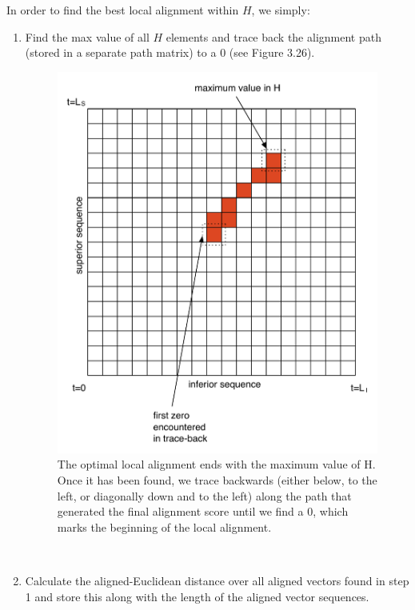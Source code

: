 \documentclass[a4paper,12pt]{report} 	%
\numberwithin{figure}{chapter}
\numberwithin{table}{chapter}
\numberwithin{equation}{chapter}
\begin{document}
\begin{flushleft}
In order to find the best local alignment within $H$, we simply:
\begin{enumerate}
\item Find the max value of all $H$ elements and trace back the alignment path (stored in a separate path matrix) to a $0$ (see Figure 3.26).
\begin{figure}[h!]
\begin{center}
\includegraphics[scale=0.75]{SIC-DPLA_1}
\caption[Finding Optimal Subsequence]{The optimal local alignment ends with the maximum value of H. Once it has been found, we trace backwards (either below, to the left, or diagonally down and to the left) along the path that generated the final alignment score until we find a $0$, which marks the beginning of the local alignment.}
\end{center}
\end{figure}
\\
\item Calculate the aligned-Euclidean distance over all aligned vectors found in step 1 and store this along with the length of the aligned vector sequences.
\end{enumerate}

\end{flushleft}
\end{document}
